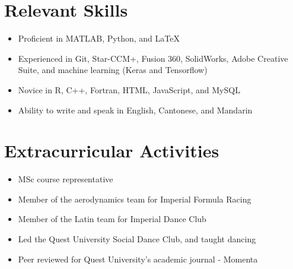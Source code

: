 \documentclass[a4paper,11pt]{article}
\newcommand{\resumeItem}[1]{
  \item\small{
    {#1\vspace{-2pt}}
  }
}
\newcommand{\resumeItemListStart}{\begin{itemize}}
\newcommand{\resumeItemListEnd}{\end{itemize}\vspace{-5pt}}
\begin{document}
\section{Relevant Skills}
\resumeItemListStart
    \resumeItem{Proficient in MATLAB, Python, and LaTeX}
    \resumeItem{Experienced in Git, Star-CCM+, Fusion 360, SolidWorks, Adobe Creative Suite, and machine learning (Keras and Tensorflow)}
    \resumeItem{Novice in R, C++, Fortran, HTML, JavaScript, and MySQL} %
    \resumeItem{Ability to write and speak in English, Cantonese, and Mandarin}
    \resumeItemListEnd

%
 \section{Extracurricular Activities}
 \resumeItemListStart
 	 \resumeItem{MSc course representative}
 	 \resumeItem{Member of the aerodynamics team for Imperial Formula Racing}
 	 \resumeItem{Member of the Latin team for Imperial Dance Club}
     \resumeItem{Led the Quest University Social Dance Club, and taught dancing}
     \resumeItem{Peer reviewed for Quest University's academic journal - Momenta}
     \resumeItemListEnd
\end{document}
